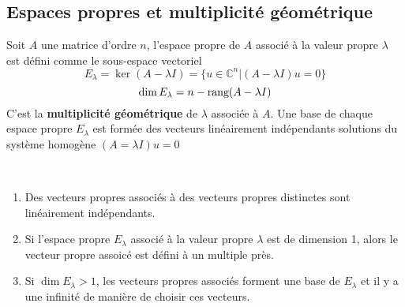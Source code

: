 	\subsection{Espaces propres et multiplicité géométrique}
		\begin{mydef}
			Soit $A$ une matrice d'ordre $n$, l'espace propre de $A$ associé à la valeur propre $\lambda$ est défini comme le sous-espace vectoriel 
			\[E_{\lambda}=\ker(A-\lambda I)=\{u\in\mathbb{C}^n \lvert (A-\lambda I)u=0\}\]
			\[\dim E_{\lambda}=n-\text{\normalfont{rang}}(A-\lambda I)\]
			C'est la \textbf{multiplicité géométrique} de $\lambda$ associée à $A$. Une base de chaque espace propre $E_{\lambda}$ est formée des vecteurs linéairement indépendants solutions du système homogène $(A=\lambda I)u=0$
		\end{mydef}
		\begin{myprop}
			~
			\begin{enumerate}
				\item Des vecteurs propres associés à des vecteurs propres distinctes sont linéairement indépendants.
				\item Si l'espace propre $E_{\lambda}$ associé à la valeur propre $\lambda$ est de dimension 1, alors le vecteur propre assoicé est défini à un multiple près.
				\item Si $\dim E_{\lambda}>1$, les vecteurs propres associés forment une base de $E_{\lambda}$ et il y a une infinité de manière de choisir ces vecteurs.
			\end{enumerate}
		\end{myprop}
